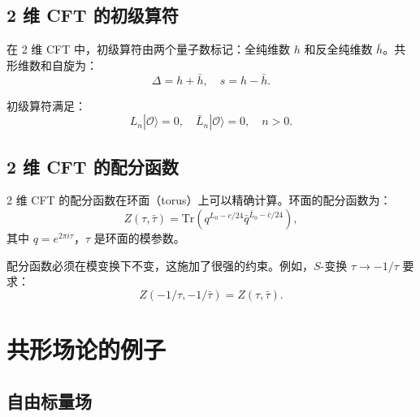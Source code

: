 \subsection{2 维 CFT 的初级算符}

\begin{definition}[2 维初级算符]
在 2 维 CFT 中，初级算符由两个量子数标记：全纯维数 $h$ 和反全纯维数 $\bar{h}$。共形维数和自旋为：
\begin{equation}
    \Delta = h + \bar{h}, \quad s = h - \bar{h}.
\end{equation}

初级算符满足：
\begin{equation}
    L_n |\mathcal{O}\rangle = 0, \quad \bar{L}_n |\mathcal{O}\rangle = 0, \quad n > 0.
\end{equation}
\end{definition}

\subsection{2 维 CFT 的配分函数}

\begin{theorem}[环面配分函数]
2 维 CFT 的配分函数在环面（torus）上可以精确计算。环面的配分函数为：
\begin{equation}
    Z(\tau, \bar{\tau}) = \text{Tr} \left( q^{L_0 - c/24} \bar{q}^{\bar{L}_0 - \bar{c}/24} \right),
\end{equation}
其中 $q = e^{2\pi i \tau}$，$\tau$ 是环面的模参数。
\end{theorem}

\begin{property}[模不变性]
配分函数必须在模变换下不变，这施加了很强的约束。例如，$S$-变换 $\tau \to -1/\tau$ 要求：
\begin{equation}
    Z(-1/\tau, -1/\bar{\tau}) = Z(\tau, \bar{\tau}).
\end{equation}
\end{property}

\section{共形场论的例子}

\subsection{自由标量场}

